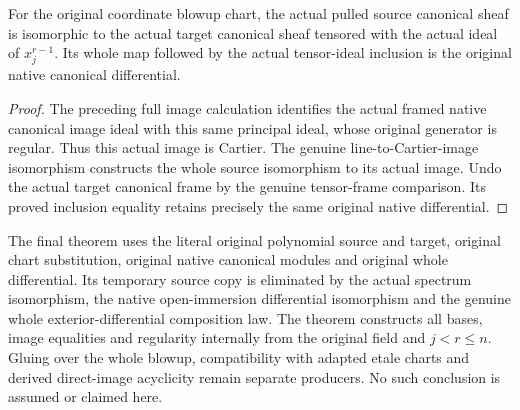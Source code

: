 \begin{theorem}
\label{thm:kn-blowup-canonical-affine-ideal-iso}
\leanok
{}
For the original coordinate blowup chart, the actual pulled source
canonical sheaf is isomorphic to the actual target canonical sheaf tensored
with the actual ideal of $x_j^{r-1}$. Its whole map followed by the actual
tensor-ideal inclusion is the original native canonical differential.
\end{theorem}
\begin{proof}
The preceding full image calculation identifies the actual framed native
canonical image ideal with this same principal ideal, whose original
generator is regular. Thus this actual image is Cartier. The genuine
line-to-Cartier-image isomorphism constructs the whole source isomorphism
to its actual image. Undo the actual target canonical frame by the genuine
tensor-frame comparison. Its proved inclusion equality retains precisely
the same original native differential.
\end{proof}

\begin{remark}
The final theorem uses the literal original polynomial source and target,
original chart substitution, original native canonical modules and original
whole differential. Its temporary source copy is eliminated by the actual
spectrum isomorphism, the native open-immersion differential isomorphism
and the genuine whole exterior-differential composition law. The theorem
constructs all bases, image equalities and regularity internally from the
original field and $j<r\leq n$. Gluing over the whole blowup, compatibility
with adapted etale charts and derived direct-image acyclicity remain
separate producers. No such conclusion is assumed or claimed here.
\end{remark}
